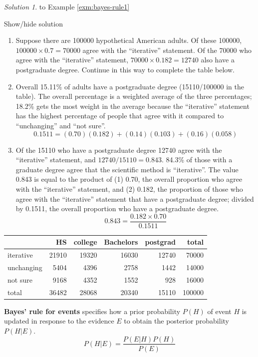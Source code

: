 \documentclass[
]{book}
\providecommand{\tightlist}{%
  \setlength{\itemsep}{0pt}\setlength{\parskip}{0pt}}
\theoremstyle{definition}
\theoremstyle{definition}
\theoremstyle{definition}
\theoremstyle{remark}
\newtheorem*{solution}{Solution}
\begin{document}
\begin{solution}
{}to Example \ref{exm:bayes-rule1}
\end{solution}

Show/hide solution

\begin{enumerate}
\def\labelenumi{\arabic{enumi}.}
\tightlist
\item
  Suppose there are 100000 hypothetical American adults. Of these 100000, \(100000\times 0.7 = 70000\) agree with the ``iterative'' statement.
  Of the 70000 who agree with the ``iterative'' statement, \(70000\times 0.182 = 12740\) also have a postgraduate degree.
  Continue in this way to complete the table below.
\item
  Overall 15.11\% of adults have a postgraduate degree (15110/100000 in the table).
  The overall percentage is a weighted average of the three percentages; 18.2\% gets the most weight in the average because the ``iterative'' statement has the highest percentage of people that agree with it compared to ``unchanging'' and ``not sure''.
  \[
   0.1511 = (0.70)(0.182) + (0.14)(0.103) + (0.16)(0.058)  
   \]
\item
  Of the 15110 who have a postgraduate degree 12740 agree with the ``iterative'' statement, and \(12740/15110 = 0.843\). 84.3\% of those with a graduate degree agree that the scientific method is ``iterative''. The value 0.843 is equal to the product of (1) 0.70, the overall proportion who agree with the ``iterative'' statement, and (2) 0.182, the proportion of those who agree with the ``iterative'' statement that have a postgraduate degree; divided by 0.1511, the overall proportion who have a postgraduate degree.
  \[
    0.843 = \frac{0.182 \times 0.70}{0.1511} 
   \]
\end{enumerate}

\begin{tabular}{l|r|r|r|r|r}
\hline
 & HS & college & Bachelors & postgrad & total\\
\hline
iterative & 21910 & 19320 & 16030 & 12740 & 70000\\
\hline
unchanging & 5404 & 4396 & 2758 & 1442 & 14000\\
\hline
not sure & 9168 & 4352 & 1552 & 928 & 16000\\
\hline
total & 36482 & 28068 & 20340 & 15110 & 100000\\
\hline
\end{tabular}

\textbf{Bayes' rule for events} specifies how a prior probability \(P(H)\) of event \(H\) is updated in response to the evidence \(E\) to obtain the posterior probability \(P(H|E)\).
\[
P(H|E) = \frac{P(E|H)P(H)}{P(E)}
\]
\end{document}
